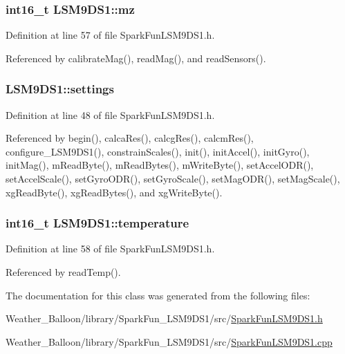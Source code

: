 \subsubsection[{\texorpdfstring{mz}{mz}}]{\setlength{\rightskip}{0pt plus 5cm}int16\+\_\+t L\+S\+M9\+D\+S1\+::mz}\hypertarget{class_l_s_m9_d_s1_aafe23993500ece9efd161e564787dce2}{}\label{class_l_s_m9_d_s1_aafe23993500ece9efd161e564787dce2}


Definition at line 57 of file Spark\+Fun\+L\+S\+M9\+D\+S1.\+h.



Referenced by calibrate\+Mag(), read\+Mag(), and read\+Sensors().

\subsubsection[{\texorpdfstring{settings}{settings}}]{ L\+S\+M9\+D\+S1\+::settings}\hypertarget{class_l_s_m9_d_s1_a8397fc6c94a11a8a09f3dd17b28cf2a4}{}\label{class_l_s_m9_d_s1_a8397fc6c94a11a8a09f3dd17b28cf2a4}


Definition at line 48 of file Spark\+Fun\+L\+S\+M9\+D\+S1.\+h.



Referenced by begin(), calca\+Res(), calcg\+Res(), calcm\+Res(), configure\+\_\+\+L\+S\+M9\+D\+S1(), constrain\+Scales(), init(), init\+Accel(), init\+Gyro(), init\+Mag(), m\+Read\+Byte(), m\+Read\+Bytes(), m\+Write\+Byte(), set\+Accel\+O\+D\+R(), set\+Accel\+Scale(), set\+Gyro\+O\+D\+R(), set\+Gyro\+Scale(), set\+Mag\+O\+D\+R(), set\+Mag\+Scale(), xg\+Read\+Byte(), xg\+Read\+Bytes(), and xg\+Write\+Byte().

\subsubsection[{\texorpdfstring{temperature}{temperature}}]{\setlength{\rightskip}{0pt plus 5cm}int16\+\_\+t L\+S\+M9\+D\+S1\+::temperature}\hypertarget{class_l_s_m9_d_s1_a92791effe47c0f8c93505e53496266e5}{}\label{class_l_s_m9_d_s1_a92791effe47c0f8c93505e53496266e5}


Definition at line 58 of file Spark\+Fun\+L\+S\+M9\+D\+S1.\+h.



Referenced by read\+Temp().



The documentation for this class was generated from the following files\+:\begin{DoxyCompactItemize}
\item 
Weather\+\_\+\+Balloon/library/\+Spark\+Fun\+\_\+\+L\+S\+M9\+D\+S1/src/\hyperlink{_spark_fun_l_s_m9_d_s1_8h}{Spark\+Fun\+L\+S\+M9\+D\+S1.\+h}\item 
Weather\+\_\+\+Balloon/library/\+Spark\+Fun\+\_\+\+L\+S\+M9\+D\+S1/src/\hyperlink{_spark_fun_l_s_m9_d_s1_8cpp}{Spark\+Fun\+L\+S\+M9\+D\+S1.\+cpp}\end{DoxyCompactItemize}
